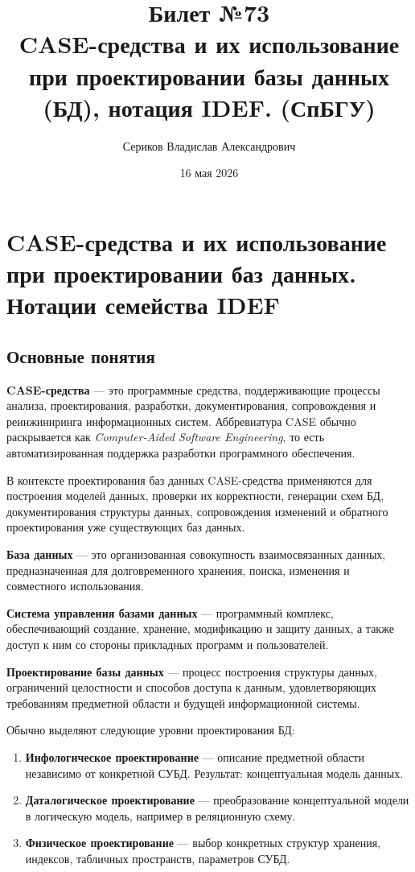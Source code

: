 \documentclass[12pt,a4paper]{article}
\title{Билет №73 \\ \small CASE-средства и их использование при проектировании базы данных (БД), нотация IDEF. (СпБГУ)}
\author{Сериков Владислав Александрович}
\date{16 мая 2026}
\theoremstyle{remark}
\begin{document}
\maketitle
\tableofcontents
\newpage

\section{CASE-средства и их использование при проектировании баз данных. Нотации семейства IDEF}

\subsection{Основные понятия}

\textbf{CASE-средства} --- это программные средства, поддерживающие процессы анализа, проектирования, разработки, документирования, сопровождения и реинжиниринга информационных систем. Аббревиатура CASE обычно раскрывается как \textit{Computer-Aided Software Engineering}, то есть автоматизированная поддержка разработки программного обеспечения.

В контексте проектирования баз данных CASE-средства применяются для построения моделей данных, проверки их корректности, генерации схем БД, документирования структуры данных, сопровождения изменений и обратного проектирования уже существующих баз данных.

\textbf{База данных} --- это организованная совокупность взаимосвязанных данных, предназначенная для долговременного хранения, поиска, изменения и совместного использования.

\textbf{Система управления базами данных} --- программный комплекс, обеспечивающий создание, хранение, модификацию и защиту данных, а также доступ к ним со стороны прикладных программ и пользователей.

\textbf{Проектирование базы данных} --- процесс построения структуры данных, ограничений целостности и способов доступа к данным, удовлетворяющих требованиям предметной области и будущей информационной системы.

Обычно выделяют следующие уровни проектирования БД:

\begin{enumerate}
    \item \textbf{Инфологическое проектирование} --- описание предметной области независимо от конкретной СУБД. Результат: концептуальная модель данных.
    \item \textbf{Даталогическое проектирование} --- преобразование концептуальной модели в логическую модель, например в реляционную схему.
    \item \textbf{Физическое проектирование} --- выбор конкретных структур хранения, индексов, табличных пространств, параметров СУБД.
\end{enumerate}
\end{document}

